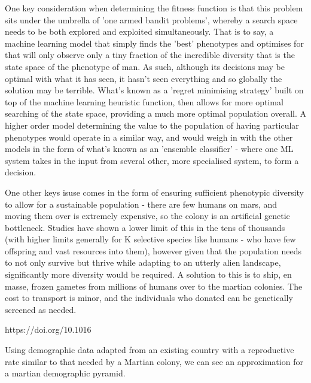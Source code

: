 \documentclass[10pt]{article}
\begin{document}
One key consideration when determining the fitness function is that this problem sits under the umbrella of 'one armed bandit problems', whereby a search space needs to be both explored and exploited simultaneously. That is to say, a machine learning model that simply finds the 'best' phenotypes and optimises for that will only observe only a tiny fraction of the incredible diversity that is the state space of the phenotype of man. As such, although its decisions may be optimal with what it has seen, it hasn't seen everything and so globally the solution may be terrible. What's known as a 'regret minimising strategy' built on top of the machine learning heuristic function, then allows for more optimal searching of the state space, providing a much more optimal population overall. A higher order model determining the value to the population of having particular phenotypes would operate in a similar way, and would weigh in with the other models in the form of what's known as an 'ensemble classifier' - where one ML system takes in the input from several other, more specialised system, to form a decision.

One other keys isuse comes in the form of ensuring sufficient phenotypic diversity to allow for a sustainable population - there are few humans on mars, and moving them over is extremely expensive, so the colony is an artificial genetic bottleneck. Studies have shown a lower limit of this in the tens of thousands (with higher limits generally for K selective species like humans - who have few offspring and vast resources into them), however given that the population needs to not only survive but thrive while adapting to an utterly alien landscape, significantly more diversity would be required. A solution to this is to ship, en masse, frozen gametes from millions of humans over to the martian colonies. The cost to transport is minor, and the individuals who donated can be genetically screened as needed. 

https://doi.org/10.1016%


Using demographic data adapted from an existing country with a reproductive rate similar to that needed by a Martian colony, we can see an approximation for a martian demographic pyramid.
\end{document}
